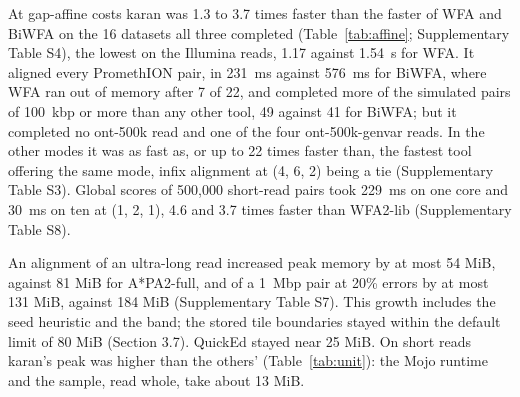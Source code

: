 At gap-affine costs karan was 1.3 to 3.7 times faster than the faster of WFA and BiWFA on the 16 datasets all three completed (Table~\ref{tab:affine}; Supplementary Table S4), the lowest on the Illumina reads, 1.17 against 1.54~\textmu s for WFA. It aligned every PromethION pair, in 231~ms against 576~ms for BiWFA, where WFA ran out of memory after 7 of 22, and completed more of the simulated pairs of 100~kbp or more than any other tool, 49 against 41 for BiWFA; but it completed no ont-500k read and one of the four ont-500k-genvar reads. In the other modes it was as fast as, or up to 22 times faster than, the fastest tool offering the same mode, infix alignment at (4, 6, 2) being a tie (Supplementary Table S3). Global scores of 500{,}000 short-read pairs took 229~ms on one core and 30~ms on ten at (1, 2, 1), 4.6 and 3.7 times faster than WFA2-lib (Supplementary Table S8).







An alignment of an ultra-long read increased peak memory by at most 54 MiB, against 81 MiB for A*PA2-full, and of a 1~Mbp pair at 20\% errors by at most 131 MiB, against 184 MiB (Supplementary Table S7). This growth includes the seed heuristic and the band; the stored tile boundaries stayed within the default limit of 80 MiB (Section 3.7). QuickEd stayed near 25 MiB. On short reads karan's peak was higher than the others' (Table~\ref{tab:unit}): the Mojo runtime and the sample, read whole, take about 13 MiB.
